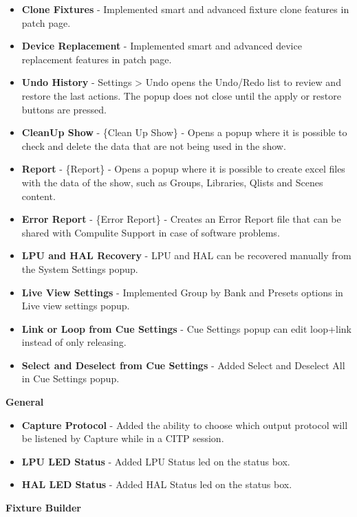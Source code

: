 \documentclass[
]{article}
\begin{document}
\begin{itemize}
\item
  \textbf{Clone Fixtures} - Implemented smart and advanced fixture clone features in patch page.
\item
  \textbf{Device Replacement} - Implemented smart and advanced device replacement features in patch page.
\item
  \textbf{Undo History} - Settings \textgreater{} Undo opens the Undo/Redo list to review and restore the last actions. The popup does not close until the apply or restore buttons are pressed.
\item
  \textbf{CleanUp Show} - \{Clean Up Show\} - Opens a popup where it is possible to check and delete the data that are not being used in the show.
\item
  \textbf{Report} - \{Report\} - Opens a popup where it is possible to create excel files with the data of the show, such as Groups, Libraries, Qlists and Scenes content.
\item
  \textbf{Error Report} - \{Error Report\} - Creates an Error Report file that can be shared with Compulite Support in case of software problems.
\item
  \textbf{LPU and HAL Recovery} - LPU and HAL can be recovered manually from the System Settings popup.
\item
  \textbf{Live View Settings} - Implemented Group by Bank and Presets options in Live view settings popup.
\item
  \textbf{Link or Loop from Cue Settings} - Cue Settings popup can edit loop+link instead of only releasing.
\item
  \textbf{Select and Deselect from Cue Settings} - Added Select and Deselect All in Cue Settings popup.
\end{itemize}

\textbf{General}

\begin{itemize}
\item
  \textbf{Capture Protocol} - Added the ability to choose which output protocol will be listened by Capture while in a CITP session.
\item
  \textbf{LPU LED Status} - Added LPU Status led on the status box.
\item
  \textbf{HAL LED Status} - Added HAL Status led on the status box.
\end{itemize}

\textbf{Fixture Builder}
\end{document}
